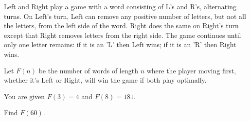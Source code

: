 Left and Right play a game with a word consisting of L's and R's, alternating turns. On Left's turn, Left can remove any positive number of letters, but not all the letters, from the left side of the word. Right does the same on Right's turn except that Right removes letters from the right side. The game continues until only one letter remains: if it is an 'L' then Left wins; if it is an 'R' then Right wins.

Let $F(n)$ be the number of words of length $n$ where the player moving first, whether it's Left or Right, will win the game if both play optimally.

You are given $F(3)=4$ and $F(8)=181$.

Find $F(60)$.
